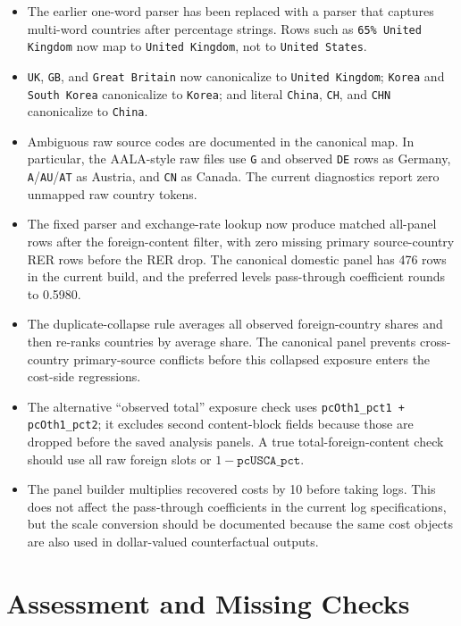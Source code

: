 \documentclass[11pt]{article}
\begin{document}
\begin{itemize}
  \item The earlier one-word parser has been replaced with a parser that captures multi-word countries after percentage strings. Rows such as \texttt{65\% United Kingdom} now map to \texttt{United Kingdom}, not to \texttt{United States}.
  \item \texttt{UK}, \texttt{GB}, and \texttt{Great Britain} now canonicalize to \texttt{United Kingdom}; \texttt{Korea} and \texttt{South Korea} canonicalize to \texttt{Korea}; and literal \texttt{China}, \texttt{CH}, and \texttt{CHN} canonicalize to \texttt{China}.
  \item Ambiguous raw source codes are documented in the canonical map. In particular, the AALA-style raw files use \texttt{G} and observed \texttt{DE} rows as Germany, \texttt{A}/\texttt{AU}/\texttt{AT} as Austria, and \texttt{CN} as Canada. The current diagnostics report zero unmapped raw country tokens.
  \item The fixed parser and exchange-rate lookup now produce matched all-panel rows after the foreign-content filter, with zero missing primary source-country RER rows before the RER drop. The canonical domestic panel has 476 rows in the current build, and the preferred levels pass-through coefficient rounds to 0.5980.
  \item The duplicate-collapse rule averages all observed foreign-country shares and then re-ranks countries by average share. The canonical panel prevents cross-country primary-source conflicts before this collapsed exposure enters the cost-side regressions.
  \item The alternative ``observed total'' exposure check uses \texttt{pcOth1\_pct1 + pcOth1\_pct2}; it excludes second content-block fields because those are dropped before the saved analysis panels. A true total-foreign-content check should use all raw foreign slots or \(1-\texttt{pcUSCA\_pct}\).
  \item The panel builder multiplies recovered costs by 10 before taking logs. This does not affect the pass-through coefficients in the current log specifications, but the scale conversion should be documented because the same cost objects are also used in dollar-valued counterfactual outputs.
\end{itemize}

\section{Assessment and Missing Checks}
\end{document}
